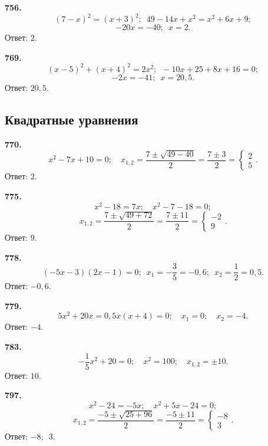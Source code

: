 \textbf{756.} $$\left(7-x\right)^2=\left(x+3\right)^2;\enspace 49-14x+x^2=x^2+6x+9;$$$$ -20x=-40;\enspace x=2.$$ \newline \null \hspace*{\fill} Ответ: $2$.    

\textbf{769.} $$\left(x-5\right)^2+\left(x+4\right)^2=2x^2;\enspace -10x+25+8x+16=0;$$$$ -2x=-41;\enspace x=20,5.$$ \newline \null \hspace*{\fill} Ответ: $20,5$.    

\subsection{Квадратные уравнения}


\textbf{770.} $$x^2-7x+10=0;\quad x_{1,2}=\frac{7\pm\sqrt{49-40}}{2}=\frac{7\pm3}{2}=\begin{cases}2 \\5 \end{cases}.$$ \newline \null \hspace*{\fill} Ответ: $2$.  

\newpage\textbf{775.} $$x^2-18=7x;\quad x^2-7-18=0;$$$$ x_{1,2}=\frac{7\pm\sqrt{49+72}}{2}=\frac{7\pm11}{2}=\begin{cases}-2 \\9 \end{cases}.$$ \newline \null \hspace*{\fill} Ответ: $9$. 

\textbf{778.} $$(-5x-3)(2x-1)=0;\enspace x_1=-\frac{3}{5}=-0,6;\enspace x_2=\frac{1}{2}=0,5.$$ \newline \null \hspace*{\fill} Ответ: $-0,6$. 

\textbf{779.} $$5x^2+20x=0,5x(x+4)=0;\quad x_1=0;\quad x_2=-4.$$ \newline \null \hspace*{\fill} Ответ: $-4$. 

\textbf{783.} $$-\frac{1}{5}x^2+20=0;\quad x^2=100;\quad x_{1,2}=\pm10.$$ \newline \null \hspace*{\fill} Ответ: $10$. 

\textbf{797.} $$x^2-24=-5x;\quad x^2+5x-24=0;$$$$ x_{1,2}=\frac{-5\pm\sqrt{25+96}}{2}=\frac{-5\pm11}{2}=\begin{cases}-8 \\3 \end{cases}.$$ \newline \null \hspace*{\fill} Ответ: $-8;\enspace3$. 

